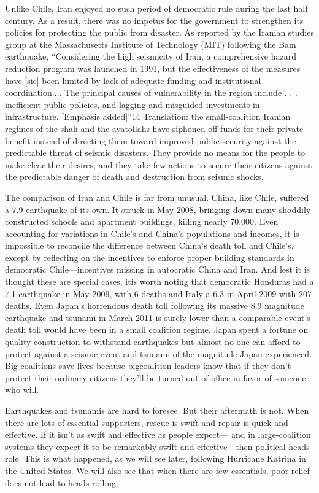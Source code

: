 \documentclass[10pt]{article}
\begin{document}
{\large Unlike Chile, Iran enjoyed no such period of democratic rule during the
last half century. As a result, there was no impetus for the government to
strengthen its policies for protecting the public from disaster. As reported by
the Iranian studies group at the Massachusetts Institute of Technology (MIT)
following the Bam earthquake, ``Considering the high seismicity of Iran, a
comprehensive hazard reduction program was launched in 1991, but the
effectiveness of the measures have [sic] been limited by lack of adequate funding
and institutional coordination.... The principal causes of vulnerability in the
region include . . . inefficient public policies, and lagging and misguided
investments in infrastructure. [Emphasis added]''14 Translation: the
small-coalition Iranian regimes of the shah and the ayatollahs have siphoned off
funds for their private benefit instead of directing them toward improved public
security against the predictable threat of seismic disasters. They provide no
means for the people to make clear their desires, and they take few actions to
secure their citizens against the predictable danger of death and destruction
from seismic shocks.}

{\large The comparison of Iran and Chile is far from unusual. China, like Chile,
suffered a 7.9 earthquake of its own. It struck in May 2008, bringing down many
shoddily constructed schools and apartment buildings, killing nearly 70,000. Even
accounting for variations in Chile's and China's populations and incomes, it is
impossible to reconcile the difference between China's death toll and Chile's,
except by reflecting on the incentives to enforce proper building standards in
democratic Chile---incentives missing in autocratic China and Iran. And lest it
is thought these are special cases, itis worth noting that democratic Honduras
had a 7.1 earthquake in May 2009, with 6 deaths and Italy a 6.3 in April 2009
with 207 deaths. Even Japan's horrendous death toll following its massive 8.9
magnitude earthquake and tsunami in March 2011 is surely lower than a comparable
event's death toll would have been in a small coalition regime. Japan spent a
fortune on quality construction to withstand earthquakes but almost no one can
afford to protect against a seismic event and tsunami of the magnitude Japan
experienced. Big coalitions save lives because bigcoalition leaders know that if
they don't protect their ordinary citizens they'll be turned out of office in
favor of someone who will.}

{\large Earthquakes and tsunamis are hard to foresee. But their aftermath is
not. When there are lots of essential supporters, rescue is swift and repair is
quick and effective. If it isn't as swift and effective as people expect--- and
in large-coalition systems they expect it to be remarkably swift and
effective---then political heads role. This is what happened, as we will see
later, following Hurricane Katrina in the United States. We will also see that
when there are few essentials, poor relief does not lead to heads rolling.}
\end{document}
